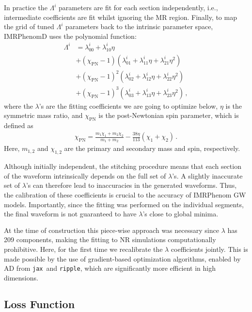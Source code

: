 \documentclass[twocolumn]{aastex631}
\newcommand{\ripple}{\texttt{ripple}}
\newcommand{\jax}{\texttt{jax}}
\begin{document}
In practice the $\Lambda^i$ parameters are fit for each section independently, i.e., intermediate coefficients are fit whilst ignoring the MR region.
Finally, to map the grid of tuned $\Lambda^i$ parameters back to the intrinsic parameter space, IMRPhenomD uses the polynomial function:
\begin{align} \label{eq:Lambda}
	\Lambda^i&=\lambda_{00}^i+\lambda_{10}^i\eta \nonumber \\
	&+(\chi_{\mathrm{PN}}-1)(\lambda_{01}^i+\lambda_{11}^i\eta+\lambda_{21}^i\eta^2) \nonumber \\ 
	&+(\chi_{\mathrm{PN}}-1)^2(\lambda_{02}^i+\lambda_{12}^i\eta+\lambda_{22}^i\eta^2) \nonumber \\
	&+(\chi_{\mathrm{PN}}-1)^3(\lambda_{03}^i+\lambda_{13}^i\eta+\lambda_{23}^i\eta^2)\,,
\end{align}
where the $\lambda$'s are the fitting coefficients we are going to optimize below, $\eta$ is
the symmetric mass ratio, and $\chi_{\mathrm{PN}}$ is the post-Newtonian spin
parameter, which is defined as 
\begin{align}
	\chi_{\mathrm{PN}}=\frac{m_1\chi_1+m_2\chi_2}{m_1+m_2}-\frac{38\eta}{113}(\chi_1+\chi_2)\,.
\end{align}
Here, $m_{1,2}$ and $\chi_{1,2}$ are the primary and secondary mass and spin,
respectively. 

Although initially independent, the stitching procedure means that each section
of the waveform intrinsically depends on the full set of $\lambda$'s. 
A slightly inaccurate set of $\lambda$'s can therefore lead to inaccuracies in
the generated waveforms. 
Thus, the calibration of these coefficients is crucial to the accuracy
of IMRPhenom GW models. 
Importantly, since the fitting was performed on the individual segments,
the final waveform is not guaranteed to have $\lambda$'s close to global minima.

At the time of construction this piece-wise approach was necessary since
$\lambda$ has 209 components, making the fitting to NR simulations computationally prohibitive.
Here, for the first time we recalibrate the $\lambda$ coefficients jointly. 
This is made possible by the use of gradient-based optimization algorithms,
enabled by AD from \jax\, and {\ripple}, which are significantly more efficient in high dimensions.  

\subsection{Loss Function} \label{subsec:loss}
\end{document}
